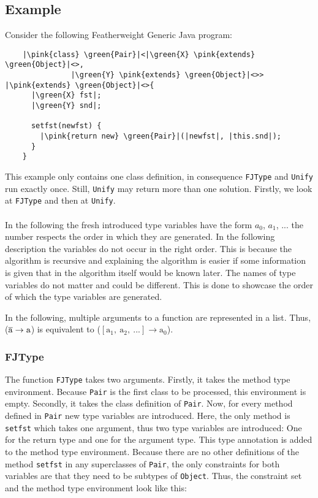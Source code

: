 \subsection{Example}

Consider the following Featherweight Generic Java program:

\begin{verbatim}
    |\pink{class} \green{Pair}|<|\green{X} \pink{extends} \green{Object}|<>,
               |\green{Y} \pink{extends} \green{Object}|<>> |\pink{extends} \green{Object}|<>{
      |\green{X} fst|;
      |\green{Y} snd|;

      setfst(newfst) {
        |\pink{return new} \green{Pair}|(|newfst|, |this.snd|);
      }
    }
\end{verbatim}

This example only contains one class definition, in consequence \verb|FJType| and \verb|Unify| run exactly once. Still, \verb|Unify| may return more than one solution.
Firstly, we look at \verb|FJType| and then at \verb|Unify|.
\\
\\
In the following the fresh introduced type variables have the form $a_0$, $a_1$, ... the number respects the order in which they are generated. In the following description the variables do not occur in the right order. This is because the algorithm is recursive and explaining the algorithm is easier
if some information is given that in the algorithm itself would be known later. The names of type variables do not matter and could be different. This is done to showcase the order of which the type variables are generated.

In the following, multiple arguments to a function are represented in a list. Thus, ($\overline{\text{a}} \to \text{a}$) is equivalent to ($[\text{a}_1, \ \text{a}_2, \ ...] \to \text{a}_0$).

\subsubsection{FJType}
The function \verb|FJType| takes two arguments. Firstly, it takes the method type environment. Because \verb|Pair| is the first class to be processed, this environment is empty. Secondly, it takes the class definition of \verb|Pair|.
Now, for every method defined in \verb|Pair| new type variables are introduced. Here, the only method is \verb|setfst| which takes one argument, thus two type variables are introduced: One for the return type and one for the argument type. This type annotation is added to the method type environment.
Because there are no other definitions of the method \verb|setfst| in any superclasses of \verb|Pair|, the only constraints for both variables are that they need to be subtypes of \verb|Object|. Thus, the constraint set and the method type environment look like this:

